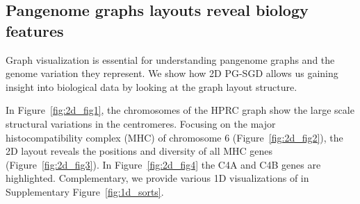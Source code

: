 \documentclass{bioinfo}
\theoremstyle{definition}
\begin{document}
    \subsection{Pangenome graphs layouts reveal biology features}
	Graph visualization is essential for understanding pangenome graphs and the genome variation they represent. 
	We show how 2D PG-SGD allows us gaining insight into biological data by looking at the graph layout structure. 
			
	In Figure~\ref{fig:2d_fig1}, the chromosomes of the HPRC graph show the large scale structural variations in the centromeres.
	Focusing on the major histocompatibility complex (MHC) of chromosome 6 (Figure~\ref{fig:2d_fig2}), the 2D layout reveals the positions and diversity of all MHC genes (Figure~\ref{fig:2d_fig3}).
	In Figure~\ref{fig:2d_fig4} the C4A and C4B genes are highlighted. 
	Complementary, we provide various 1D visualizations of in Supplementary Figure~\ref{fig:1d_sorts}.
\end{document}
